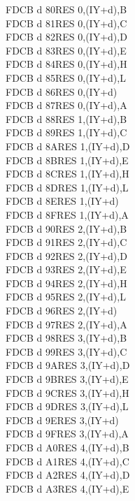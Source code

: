 \documentclass[12pt,twoside,openright,a4paper]{book}
\begin{document}
\begin{multicols}{3}
{\begin{tabbing}
	FDCB d 80\>RES 0,(IY+d),B\UNDOC\\
	FDCB d 81\>RES 0,(IY+d),C\UNDOC\\
	FDCB d 82\>RES 0,(IY+d),D\UNDOC\\
	FDCB d 83\>RES 0,(IY+d),E\UNDOC\\
	FDCB d 84\>RES 0,(IY+d),H\UNDOC\\
	FDCB d 85\>RES 0,(IY+d),L\UNDOC\\
	FDCB d 86\>RES 0,(IY+d)\\
	FDCB d 87\>RES 0,(IY+d),A\UNDOC\\
	FDCB d 88\>RES 1,(IY+d),B\UNDOC\\
	FDCB d 89\>RES 1,(IY+d),C\UNDOC\\
	FDCB d 8A\>RES 1,(IY+d),D\UNDOC\\
	FDCB d 8B\>RES 1,(IY+d),E\UNDOC\\
	FDCB d 8C\>RES 1,(IY+d),H\UNDOC\\
	FDCB d 8D\>RES 1,(IY+d),L\UNDOC\\
	FDCB d 8E\>RES 1,(IY+d)\\
	FDCB d 8F\>RES 1,(IY+d),A\UNDOC\\
	FDCB d 90\>RES 2,(IY+d),B\UNDOC\\
	FDCB d 91\>RES 2,(IY+d),C\UNDOC\\
	FDCB d 92\>RES 2,(IY+d),D\UNDOC\\
	FDCB d 93\>RES 2,(IY+d),E\UNDOC\\
	FDCB d 94\>RES 2,(IY+d),H\UNDOC\\
	FDCB d 95\>RES 2,(IY+d),L\UNDOC\\
	FDCB d 96\>RES 2,(IY+d)\\
	FDCB d 97\>RES 2,(IY+d),A\UNDOC\\
	FDCB d 98\>RES 3,(IY+d),B\UNDOC\\
	FDCB d 99\>RES 3,(IY+d),C\UNDOC\\
	FDCB d 9A\>RES 3,(IY+d),D\UNDOC\\
	FDCB d 9B\>RES 3,(IY+d),E\UNDOC\\
	FDCB d 9C\>RES 3,(IY+d),H\UNDOC\\
	FDCB d 9D\>RES 3,(IY+d),L\UNDOC\\
	FDCB d 9E\>RES 3,(IY+d)\\
	FDCB d 9F\>RES 3,(IY+d),A\UNDOC\\
	FDCB d A0\>RES 4,(IY+d),B\UNDOC\\
	FDCB d A1\>RES 4,(IY+d),C\UNDOC\\
	FDCB d A2\>RES 4,(IY+d),D\UNDOC\\
	FDCB d A3\>RES 4,(IY+d),E\UNDOC\\

\end{tabbing}}
\end{multicols}
\end{document}
